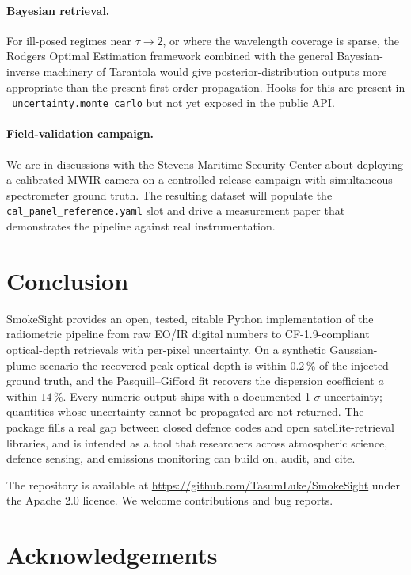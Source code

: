 \documentclass[11pt, a4paper]{article}
\begin{document}
\paragraph{Bayesian retrieval.} For ill-posed regimes near
$\tau \to 2$, or where the wavelength coverage is sparse, the
Rodgers Optimal Estimation framework \cite{rodgers2000inverse}
combined with the general Bayesian-inverse machinery of
Tarantola \cite{tarantola2005inverse} would give
posterior-distribution outputs more appropriate than the present
first-order propagation. Hooks for this are present in
\texttt{\_uncertainty.monte\_carlo} but not yet exposed in the
public API.

\paragraph{Field-validation campaign.} We are in discussions with the
Stevens Maritime Security Center about deploying a calibrated MWIR
camera on a controlled-release campaign with simultaneous spectrometer
ground truth. The resulting dataset will populate the
\texttt{cal\_panel\_reference.yaml} slot and drive a measurement paper
that demonstrates the pipeline against real instrumentation.

\section{Conclusion}
\label{sec:conclusion}

SmokeSight provides an open, tested, citable Python implementation of
the radiometric pipeline from raw EO/IR digital numbers to
CF-1.9-compliant optical-depth retrievals with per-pixel uncertainty.
On a synthetic Gaussian-plume scenario the recovered peak optical
depth is within $0.2\,\%$ of the injected ground truth, and the
Pasquill--Gifford fit recovers the dispersion coefficient $a$ within
$14\,\%$. Every numeric output ships with a documented 1-$\sigma$
uncertainty; quantities whose uncertainty cannot be propagated are not
returned. The package fills a real gap between closed defence codes
and open satellite-retrieval libraries, and is intended as a tool that
researchers across atmospheric science, defence sensing, and emissions
monitoring can build on, audit, and cite.

The repository is available at
\url{https://github.com/TasumLuke/SmokeSight} under the Apache 2.0
licence. We welcome contributions and bug reports.

\section*{Acknowledgements}
\end{document}
